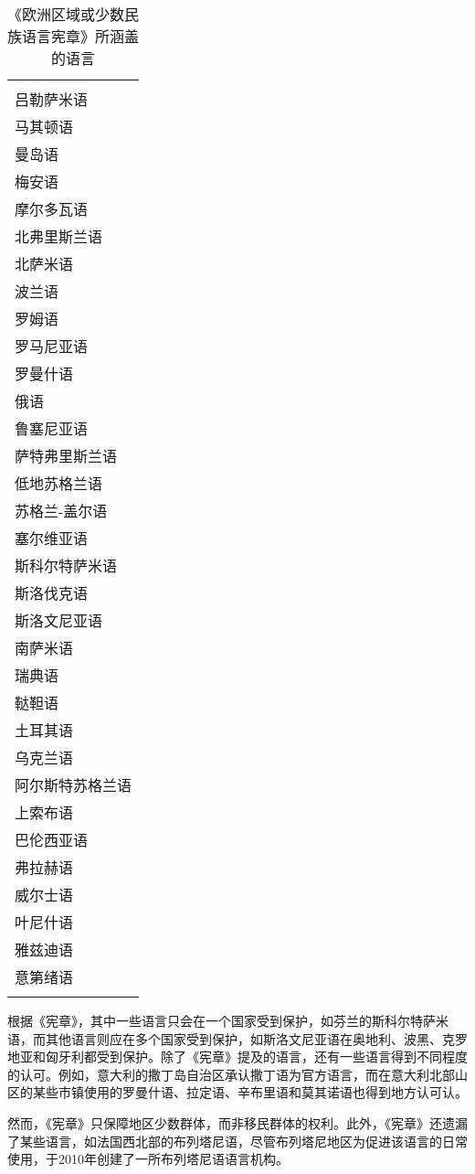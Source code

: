 \documentclass[output=paper]{langscibook}
\begin{document}
\begin{table}
\begin{tabularx}{\textwidth}{l}
{\begin{multicols}{4}
下索布语\\
吕勒萨米语\\
马其顿语\\
曼岛语\\
梅安语\\
摩尔多瓦语\\
北弗里斯兰语\\
北萨米语\\
波兰语\\
罗姆语\\
罗马尼亚语\\
罗曼什语\\
俄语\\
鲁塞尼亚语\\
萨特弗里斯兰语\\
低地苏格兰语\\
苏格兰-盖尔语\\
塞尔维亚语\\
斯科尔特萨米语\\
斯洛伐克语\\
斯洛文尼亚语\\
南萨米语\\
瑞典语\\
鞑靼语\\
土耳其语\\
乌克兰语\\
阿尔斯特苏格兰语\\
上索布语\\
巴伦西亚语\\
弗拉赫语\\
威尔士语\\
叶尼什语\\
雅兹迪语\\
意第绪语
\end{multicols}
}\\
\lspbottomrule
\end{tabularx}
\caption{《欧洲区域或少数民族语言宪章》所涵盖的语言}
\label{tab:torres:1}
\end{table}

‌根据《宪章》，其中一些语言只会在一个国家受到保护，如芬兰的斯科尔特萨米语，而其他语言则应在多个国家受到保护，如斯洛文尼亚语在奥地利、波黑、克罗地亚和匈牙利都受到保护。除了《宪章》提及的语言，还有一些语言得到不同程度的认可。例如，意大利的撒丁岛自治区承认撒丁语为官方语言，而在意大利北部山区的某些市镇使用的罗曼什语、拉定语、辛布里语和莫其诺语也得到地方认可认。

然而，《宪章》只保障地区少数群体，而非移民群体的权利。‌此外，《宪章》还遗漏了某些语言，如法国西北部的布列塔尼语，尽管布列塔尼地区为促进该语言的日常使用，于2010年创建了一所布列塔尼语语言机构。
\end{document}
